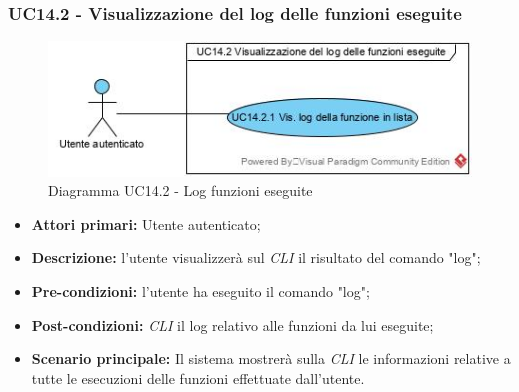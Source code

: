 \subsubsection{UC14.2 - Visualizzazione del log delle funzioni eseguite}
\begin{figure}[h]
	\centering
	\includegraphics[width=\linewidth]{res/img/UC14.2(1).jpg}
	\caption{Diagramma UC14.2 - Log funzioni eseguite}
\end{figure}
\begin{itemize}
	\item \textbf{Attori primari:} Utente autenticato;
	\item \textbf{Descrizione:} l'utente visualizzerà sul \textit{CLI\glo} il risultato del comando "log";
	\item \textbf{Pre-condizioni:} l'utente ha eseguito il comando "log";
	\item \textbf{Post-condizioni:} \textit{CLI\glo} il log relativo alle funzioni da lui eseguite;
	\item \textbf{Scenario principale:} Il sistema mostrerà sulla \textit{CLI\glo} le informazioni relative a tutte le esecuzioni delle funzioni effettuate dall'utente.
\end{itemize}

